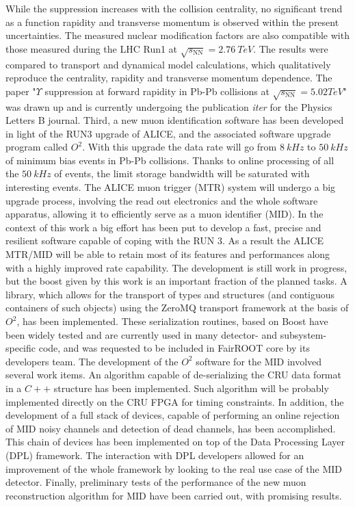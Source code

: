 While the suppression increases with the collision centrality, no significant trend as a function rapidity and transverse momentum is observed within the present uncertainties. 
The measured nuclear modification factors are also compatible with those measured during the LHC Run1 at $\sqrt{s_{\mathrm{NN}}}=2.76\ TeV$.
The results were compared to transport and dynamical model calculations, which qualitatively reproduce the centrality, rapidity and transverse momentum dependence.
The paper "$\Upsilon$ suppression at forward rapidity in Pb-Pb collisions at $\sqrt{s_{\mathrm{NN}}} = 5.02 TeV$"\cite{MINE} was drawn up and is currently undergoing the publication \textit{iter} for the Physics Letters B journal.
Third, a new muon identification software has been developed in light of the RUN3 upgrade of ALICE, and the associated software upgrade program called $O^2$.
With this upgrade the data rate will go from $8\ kHz$ to $50\ kHz$ of minimum bias events in Pb-Pb collisions.
Thanks to online processing of all the $50\ kHz$ of events, the limit storage bandwidth will be saturated with interesting events.
The ALICE muon trigger (MTR) system will undergo a big upgrade process, involving the read out electronics and the whole software apparatus, allowing it to efficiently serve as a muon identifier (MID).
In the context of this work a big effort has been put to develop a fast, precise and resilient software capable of coping with the RUN 3. 
As a result the ALICE MTR/MID will be able to retain most of its features and performances along with a highly improved rate capability. 
The development is still work in progress, but the boost given by this work is an important fraction of the planned tasks.
A library, which allows for the transport of  types and structures (and contiguous containers of such objects) using the ZeroMQ transport framework at the basis of $O^2$, has been implemented.
These serialization routines, based on Boost have been widely tested and are currently used in many detector- and subsystem-specific code, and was requested to be included in FairROOT core by its developers team. 
The development of the $O^2$ software for the MID involved several work items.
An algorithm capable of de-serializing the CRU data format in a $C++$ structure has been implemented.
Such algorithm will be probably implemented directly on the CRU FPGA for timing constraints.
In addition, the development of a full stack of devices, capable of performing an online rejection of MID noisy channels and detection of dead channels, has been accomplished.
This chain of devices has been implemented on top of the Data Processing Layer (DPL) framework.
The interaction with DPL developers allowed for an improvement of the whole framework by looking to the real use case of the MID detector.
Finally, preliminary tests of the performance of the new muon reconstruction algorithm for MID have been carried out, with promising results.
